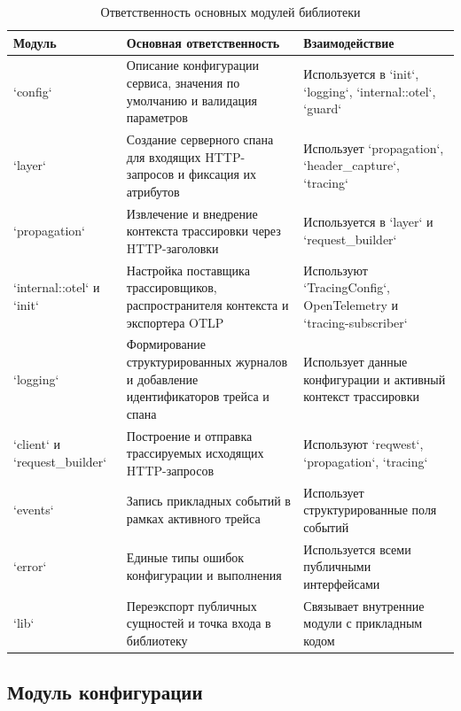 \begin{table}[H]
    \centering
    \caption{Ответственность основных модулей библиотеки}
    \label{tab:module-responsibilities}
    \renewcommand{\arraystretch}{1.2}
    \begin{tabularx}{\textwidth}{>{\raggedright\arraybackslash}p{3.0cm} >{\raggedright\arraybackslash}X >{\raggedright\arraybackslash}X}
        \toprule
        Модуль & Основная ответственность & Взаимодействие \\
        \midrule
        `config` & Описание конфигурации сервиса, значения по умолчанию и валидация параметров & Используется в `init`, `logging`, `internal::otel`, `guard` \\
        \addlinespace
        `layer` & Создание серверного спана для входящих HTTP-запросов и фиксация их атрибутов & Использует `propagation`, `header_capture`, `tracing` \\
        \addlinespace
        `propagation` & Извлечение и внедрение контекста трассировки через HTTP-заголовки & Используется в `layer` и `request_builder` \\
        \addlinespace
        `internal::otel` и `init` & Настройка поставщика трассировщиков, распространителя контекста и экспортера OTLP & Используют `TracingConfig`, OpenTelemetry и `tracing-subscriber` \\
        \addlinespace
        `logging` & Формирование структурированных журналов и добавление идентификаторов трейса и спана & Использует данные конфигурации и активный контекст трассировки \\
        \addlinespace
        `client` и `request_builder` & Построение и отправка трассируемых исходящих HTTP-запросов & Используют `reqwest`, `propagation`, `tracing` \\
        \addlinespace
        `events` & Запись прикладных событий в рамках активного трейса & Использует структурированные поля событий \\
        \addlinespace
        `error` & Единые типы ошибок конфигурации и выполнения & Используется всеми публичными интерфейсами \\
        \addlinespace
        `lib` & Переэкспорт публичных сущностей и точка входа в библиотеку & Связывает внутренние модули с прикладным кодом \\
        \bottomrule
    \end{tabularx}
\end{table}

\subsection{Модуль конфигурации}

